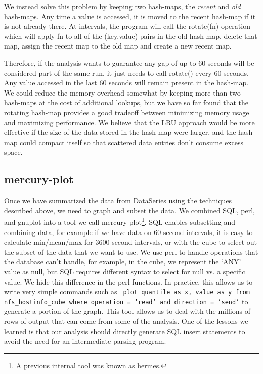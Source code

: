 We instead solve this problem by keeping two hash-maps, the {\it
recent} and {\it old} hash-maps.  Any time a value is accessed, it is
moved to the recent hash-map if it is not already there.  At intervals, 
the program will call the rotate(fn) operation which will apply
fn to all of the (key,value) pairs in the old hash map, delete that map,
assign the recent map to the old map and create a new recent map.

Therefore, if the analysis wants to guarantee any gap of up to 60
seconds will be considered part of the same run, it just needs to call
rotate() every 60 seconds.  Any value accessed in the last 60 seconds
will remain present in the hash-map.  We could reduce the memory
overhead somewhat by keeping more than two hash-maps at the cost of
additional lookups, but we have so far found that the rotating
hash-map provides a good tradeoff between minimizing memory usage and
maximizing performance.  We believe that the LRU approach would be
more effective if the size of the data stored in the hash map were
larger, and the hash-map could compact itself so that scattered
data entries don't consume excess space.

\subsection{mercury-plot}

Once we have summarized the data from DataSeries using the techniques
described above, we need to graph and subset the data.  We combined
SQL, perl, and gnuplot into a tool we call mercury-plot\footnote{A
previous internal tool was known as hermes.}.  SQL enables subsetting
and combining data, for example if we have data on 60 second
intervals, it is easy to calculate min/mean/max for 3600 second
intervals, or with the cube to select out the subset of the data that
we want to use.  We use perl to handle operations that the database
can't handle, for example, in the cube, we represent the `ANY' value
as null, but SQL requires different syntax to select for null vs. a
specific value.  We hide this difference in the perl functions.  In
practice, this allows us to write very simple commands such as {\tt
plot quantile as x, value as y from nfs\_hostinfo\_cube where
operation = 'read' and direction = 'send'} to generate a portion of
the graph.  This tool allows us to deal with the millions of rows of
output that can come from some of the analysis.  One of the lessons we
learned is that our analysis should directly generate SQL insert
statements to avoid the need for an intermediate parsing program.
